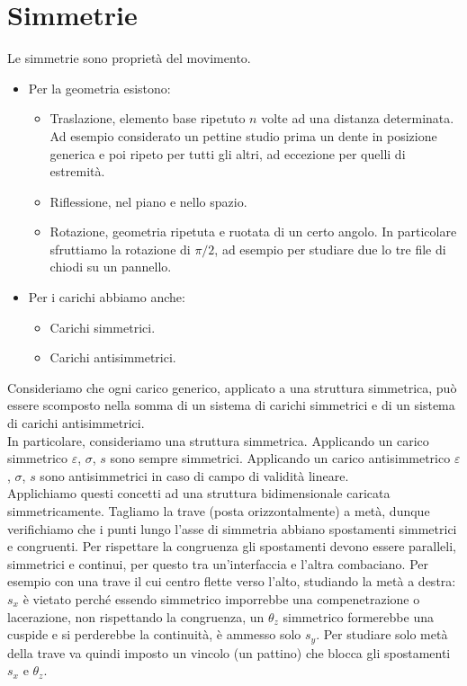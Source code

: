 \section{Simmetrie}

Le simmetrie sono proprietà del movimento.
\begin{itemize}
    \item Per la geometria esistono:
    \begin{itemize}
        \item Traslazione, elemento base ripetuto $n$ volte ad una distanza determinata. 
        Ad esempio considerato un pettine studio prima un dente in posizione generica e poi ripeto per tutti gli altri, ad eccezione per quelli di estremità.\\
        \item Riflessione, nel piano e nello spazio.\\
        \item Rotazione, geometria ripetuta e ruotata di un certo angolo. In particolare sfruttiamo la rotazione di $\pi/2$, ad esempio per studiare due lo tre file di chiodi su un pannello.
    \end{itemize}
    \item Per i carichi abbiamo anche:
    \begin{itemize}
        \item Carichi simmetrici.\\
        \item Carichi antisimmetrici.
    \end{itemize}
\end{itemize}

Consideriamo che ogni carico generico, applicato a una struttura simmetrica, può essere scomposto nella somma di un sistema di carichi simmetrici e di un sistema di carichi antisimmetrici.\\

In particolare, consideriamo una struttura simmetrica. Applicando un carico simmetrico $\varepsilon$, $\sigma$, $s$ sono sempre simmetrici. Applicando un carico antisimmetrico $\varepsilon$, $\sigma$, $s$  sono antisimmetrici in caso di campo di validità lineare.\\

Applichiamo questi concetti ad una struttura bidimensionale caricata simmetricamente. Tagliamo la trave (posta orizzontalmente) a metà, dunque verifichiamo che i punti lungo l'asse di simmetria abbiano spostamenti simmetrici e congruenti. Per rispettare la congruenza gli spostamenti devono essere paralleli, simmetrici e continui, per questo tra un'interfaccia e l'altra combaciano. Per esempio con una trave il cui centro flette verso l'alto, studiando la metà a destra: $s_x$ è vietato perché essendo simmetrico imporrebbe una compenetrazione o lacerazione, non rispettando la congruenza, un $\theta_z$ simmetrico formerebbe una cuspide e si perderebbe la continuità, è ammesso solo $s_y$. Per studiare solo metà della trave va quindi imposto un vincolo (un pattino) che blocca gli spostamenti $s_x$ e $\theta_z$.

